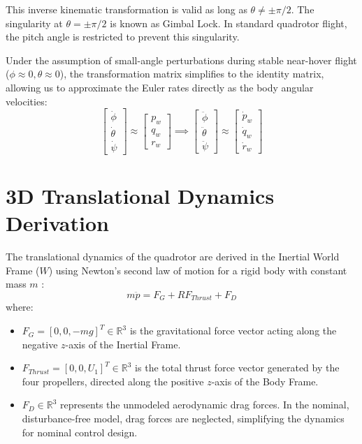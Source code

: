 This inverse kinematic transformation is valid as long as $\theta \neq \pm \pi/2$. The singularity at $\theta = \pm \pi/2$ is known as Gimbal Lock. In standard quadrotor flight, the pitch angle is restricted to prevent this singularity. 

Under the assumption of small-angle perturbations during stable near-hover flight ($\phi \approx 0, \theta \approx 0$), the transformation matrix simplifies to the identity matrix, allowing us to approximate the Euler rates directly as the body angular velocities:
\begin{equation}
\begin{bmatrix} \dot{\phi} \\ \dot{\theta} \\ \dot{\psi} \end{bmatrix} \approx \begin{bmatrix} p_w \\ q_w \\ r_w \end{bmatrix} \implies \begin{bmatrix} \ddot{\phi} \\ \ddot{\theta} \\ \ddot{\psi} \end{bmatrix} \approx \begin{bmatrix} \dot{p}_w \\ \dot{q}_w \\ \dot{r}_w \end{bmatrix}
\end{equation}

\section{3D Translational Dynamics Derivation}
The translational dynamics of the quadrotor are derived in the Inertial World Frame ($W$) using Newton's second law of motion for a rigid body with constant mass $m$ \cite{ref_59, ref_60}:
\begin{equation}
m \ddot{p} = F_G + R F_{Thrust} + F_D
\end{equation}
where:
\begin{itemize}
    \item $F_G = [0, 0, -mg]^T \in \mathbb{R}^3$ is the gravitational force vector acting along the negative $z$-axis of the Inertial Frame.
    \item $F_{Thrust} = [0, 0, U_1]^T \in \mathbb{R}^3$ is the total thrust force vector generated by the four propellers, directed along the positive $z$-axis of the Body Frame.
    \item $F_D \in \mathbb{R}^3$ represents the unmodeled aerodynamic drag forces. In the nominal, disturbance-free model, drag forces are neglected, simplifying the dynamics for nominal control design.
\end{itemize}

